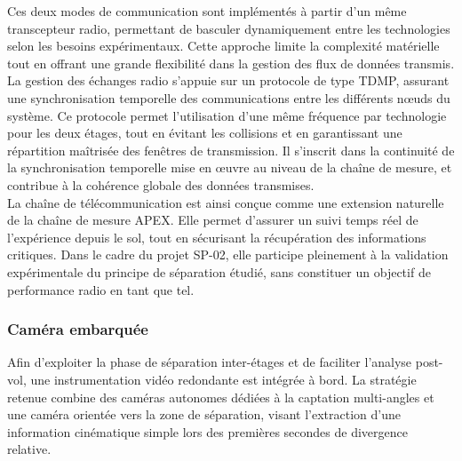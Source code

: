 Ces deux modes de communication sont implémentés à partir d’un même transcepteur radio, permettant
de basculer dynamiquement entre les technologies selon les besoins expérimentaux. Cette approche
limite la complexité matérielle tout en offrant une grande flexibilité dans la gestion des flux de données
transmis.\\

La gestion des échanges radio s’appuie sur un protocole de type \acrfull{TDMP}, assurant une synchronisation
temporelle des communications entre les différents nœuds du
système. Ce protocole permet l’utilisation d’une même fréquence par technologie pour les deux étages,
tout en évitant les collisions et en garantissant une répartition maîtrisée des fenêtres de transmission.
Il s’inscrit dans la continuité de la synchronisation temporelle mise en œuvre au niveau de la chaîne de
mesure, et contribue à la cohérence globale des données transmises.\\

La chaîne de télécommunication est ainsi conçue comme une extension naturelle de la chaîne de mesure
APEX. Elle permet d’assurer un suivi temps réel de l’expérience depuis le sol, tout en sécurisant la
récupération des informations critiques. Dans le cadre du projet SP-02, elle participe pleinement à la
validation expérimentale du principe de séparation étudié, sans constituer un objectif de performance
radio en tant que tel.

\newpage

\subsubsection{Caméra embarquée}
\label{sec:camera_embarquee}


Afin d’exploiter la phase de séparation inter-étages et de faciliter l’analyse post-vol, une instrumentation vidéo
redondante est intégrée à bord. La stratégie retenue combine des caméras autonomes dédiées à la captation
multi-angles et une caméra orientée vers la zone de séparation, visant l’extraction d’une information cinématique
simple lors des premières secondes de divergence relative.

